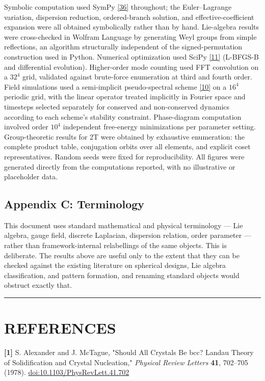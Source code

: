 \documentclass[a4paper,11pt]{article}
\begin{document}
Symbolic computation used SymPy \hyperref[ref36]{[36]} throughout; the Euler–Lagrange variation, dispersion reduction, ordered-branch solution, and effective-coefficient expansion were all obtained symbolically rather than by hand. Lie-algebra results were cross-checked in Wolfram Language by generating Weyl groups from simple reflections, an algorithm structurally independent of the signed-permutation construction used in Python. Numerical optimization used SciPy \hyperref[ref11]{[11]} (L-BFGS-B and differential evolution). Higher-order mode counting used FFT convolution on a $32^4$ grid, validated against brute-force enumeration at third and fourth order. Field simulations used a semi-implicit pseudo-spectral scheme \hyperref[ref10]{[10]} on a $16^4$ periodic grid, with the linear operator treated implicitly in Fourier space and timesteps selected separately for conserved and non-conserved dynamics according to each scheme's stability constraint. Phase-diagram computation involved order $10^4$ independent free-energy minimizations per parameter setting. Group-theoretic results for 2T were obtained by exhaustive enumeration: the complete product table, conjugation orbits over all elements, and explicit coset representatives. Random seeds were fixed for reproducibility. All figures were generated directly from the computations reported, with no illustrative or placeholder data.

\subsection*{Appendix C: Terminology}

This document uses standard mathematical and physical terminology — Lie algebra, gauge field, discrete Laplacian, dispersion relation, order parameter — rather than framework-internal relabellings of the same objects. This is deliberate. The results above are useful only to the extent that they can be checked against the existing literature on spherical designs, Lie algebra classification, and pattern formation, and renaming standard objects would obstruct exactly that.
\medskip\hrule\medskip

\section*{REFERENCES}

\label{ref1}
\noindent \textbf{[1]} S. Alexander and J. McTague, "Should All Crystals Be bcc? Landau Theory of Solidification and Crystal Nucleation," \textit{Physical Review Letters} \textbf{41}, 702–705 (1978). \href{https://doi.org/10.1103/PhysRevLett.41.702}{doi:10.1103/PhysRevLett.41.702}
\end{document}
